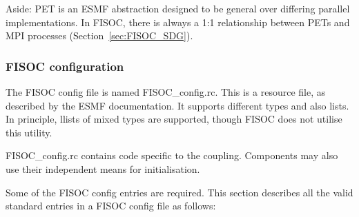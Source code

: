 \documentclass[12pt]{article}
\begin{document}
Aside: PET is an ESMF abstraction designed to be general over differing parallel implementations. 
In FISOC, there is always a 1:1 relationship between PETs and MPI processes 
(Section~\ref{sec:FISOC_SDG}). 


\subsubsection{FISOC configuration}
\label{sec:config}

The FISOC config file is named FISOC\_config.rc.  This is a resource file, as described by the 
ESMF documentation.  It supports different types and also lists. 
In principle, llists of mixed types are supported, though FISOC does not utilise this utility.

FISOC\_config.rc contains code specific to the coupling.  Components may also use their 
independent means for initialisation.

Some of the FISOC config entries are required.
This section describes all the valid standard entries in a FISOC config file as follows:
\end{document}
